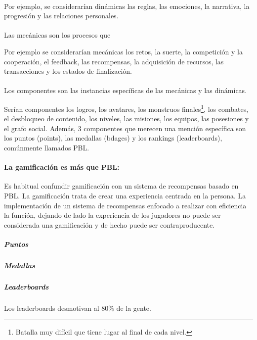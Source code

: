 \paragraph{}

Por ejemplo, se considerarían dinámicas las reglas, las emociones, la narrativa, la progresión y las relaciones personales.

\paragraph{} Las mecánicas son los procesos que 

Por ejemplo se considerarían mecánicas los retos, la suerte, la competición y la cooperación, el feedback, las recompensas, la adquisición de recursos, las transacciones y los estados de finalización.

\paragraph{} Los componentes son las instancias específicas de las mecánicas y las dinámicas. 

Serían componentes los logros, los avatares, los monstruos finales\footnote{Batalla muy difícil que tiene lugar al final de cada nivel.}, los combates, el desbloqueo de contenido, los niveles, las misiones, los equipos, las posesiones y el grafo social.
%
Además, 3 componentes que merecen una mención específica son los puntos (points), las medallas (bdages) y los rankings (leaderboards), comúnmente llamados \gls{PBL}.

\paragraph{La gamificación es más que \gls{PBL}:} Es habitual confundir gamificación con un sistema de recompensas basado en \gls{PBL}. 
%
La gamificación trata de crear una experiencia centrada en la persona. 
%
La implementación de un sistema de recompensas enfocado a realizar con eficiencia la función, dejando de lado la experiencia de los jugadores no puede ser considerada una gamificación y de hecho puede ser contraproducente.


\subparagraph*{Puntos}

\subparagraph*{Medallas}

\subparagraph*{Leaderboards}

Los leaderboards desmotivan al 80\% de la gente. 

